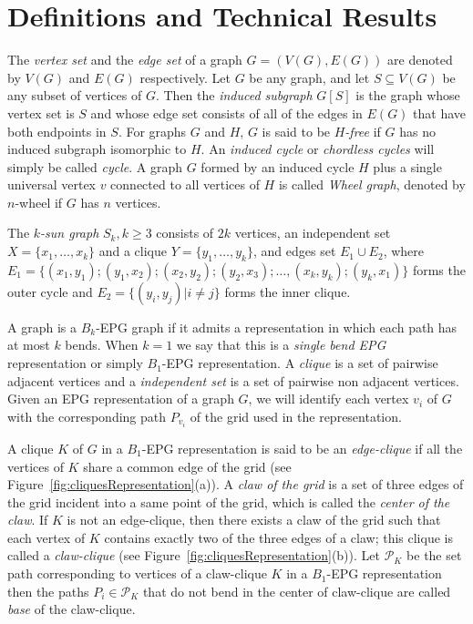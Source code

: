 \documentclass[9pt]{entcs}
\begin{document}
\section{Definitions and Technical Results}

The \textit{vertex set} and the \textit{edge set} of a graph $G=(V(G), E(G))$ are denoted by $V(G)$ and $E(G)$ respectively. 
Let $G$ be any graph, and let $S \subseteq V(G)$ be any subset of vertices of $G$. Then the \textit{induced subgraph} $G[S]$ is the graph whose vertex set is $S$ and whose edge set consists of all of the edges in $E(G)$ that have both endpoints in $S$.
For graphs $G$ and $H$, $G$ is said to be \textit{$H$-free} if $G$ has no induced subgraph isomorphic to $H$. An \textit{induced cycle} or \textit{chordless cycles} will simply be called  \textit{cycle}. A graph $G$ formed by an induced cycle $H$ plus  a single universal vertex $v$ connected to all vertices of $H$
is called \textit{Wheel graph}, denoted by $n$-wheel if $G$ has $n$ vertices. 

The $k$\textit{-sun graph }$S_k, k \geq 3$ consists of
$2k$ vertices, an independent set $X = \{x_1, \dots, x_k\}$ and a clique $Y = \{y_1, \dots, y_k\}$, and edges set $E_1 \cup E_2$, where $E_ 1=\{ (x_1,y_1); (y_1, x_2); (x_2, y_2); (y_2, x_3); \dots , (x_k, y_k); (y_k, x_1) \}$ forms the outer cycle and $E_2= \{(y_i, y_j) |i\neq j\}$ forms the inner clique.

A graph is a $ B_k$-EPG graph if it admits a representation in which each path has at most $k$ bends.  When $ k = 1 $ we say that this is a \emph{single bend EPG} representation or simply $B_1$-EPG representation.
A \textit{clique} is a set of pairwise adjacent vertices and
a \textit{independent set} is a set of pairwise non adjacent vertices.
Given an EPG representation of a graph $G$, we will identify each vertex $v_i$ of $G$ with the corresponding path $P_{v_i}$ of the grid used in the representation. 

A clique $K$ of $G$  in a $B_1$-EPG representation is said to be
 an \textit{edge-clique} if all the vertices of $K$ share a common edge of the grid (see Figure~\ref{fig:cliquesRepresentation}(a)).
 A \textit{claw of the grid} is a set of three edges of the grid incident into a same point of the grid, which is called
  the \textit{center of the claw}. If $K$ is not an edge-clique, then there exists
    a claw of the grid such that each vertex of $K$ contains exactly two of the three edges of a claw; this clique is called a \textit{claw-clique} \cite{golumbic2009} (see Figure~\ref{fig:cliquesRepresentation}(b)). Let $\mathcal{P}_K$ be the set path corresponding to vertices of a claw-clique $K$ in a $B_1$-EPG representation then the paths $P_i \in \mathcal{P}_K$ that do not bend in the center of claw-clique are called \textit{base} of the claw-clique.
    
\end{document}
